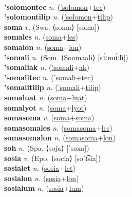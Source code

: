  \label{'solomonwon} \\
\textbf{'solomontec} \textit{n.} (\hyperref['solomon]{'solomon}+\hyperref[tec]{tec})
 \label{'solomontec} \\
\textbf{'solomontilip} \textit{n.} (\hyperref['solomon]{'solomon}+\hyperref[tilip]{tilip})
 \label{'solomontilip} \\
\textbf{soma} \textit{v.} (Swa. ⟨soma⟩ [soma])
 \label{soma} \\
\textbf{somales} \textit{n.} (\hyperref[soma]{soma}+\hyperref[les]{les})
 \label{somales} \\
\textbf{somalon} \textit{n.} (\hyperref[soma]{soma}+\hyperref[lon]{lon})
 \label{somalon} \\
\textbf{'somali} \textit{n.} (Som. ⟨Soomaali⟩ [sɔ̀ːmɑ́ːlì])
 \label{'somali} \\
\textbf{'somaliak} \textit{n.} (\hyperref['somali]{'somali}+\hyperref[ak]{ak})
 \label{'somaliak} \\
\textbf{'somalitec} \textit{n.} (\hyperref['somali]{'somali}+\hyperref[tec]{tec})
 \label{'somalitec} \\
\textbf{'somalitilip} \textit{n.} (\hyperref['somali]{'somali}+\hyperref[tilip]{tilip})
 \label{'somalitilip} \\
\textbf{somaluat} \textit{n.} (\hyperref[soma]{soma}+\hyperref[luat]{luat})
 \label{somaluat} \\
\textbf{somalyot} \textit{n.} (\hyperref[soma]{soma}+\hyperref[lyot]{lyot})
 \label{somalyot} \\
\textbf{somasoma} \textit{v.} (\hyperref[soma]{soma}+\hyperref[soma]{soma})
 \label{somasoma} \\
\textbf{somasomales} \textit{n.} (\hyperref[somasoma]{somasoma}+\hyperref[les]{les})
 \label{somasomales} \\
\textbf{somasomalon} \textit{n.} (\hyperref[somasoma]{somasoma}+\hyperref[lon]{lon})
 \label{somasomalon} \\
\textbf{soh} \textit{n.} (Spa. ⟨soja⟩ [ˈsoxa])
 \label{soh} \\
\textbf{sosia} \textit{v.} (Epo. ⟨socia⟩ [soˈt͡sia])
 \label{sosia} \\
\textbf{sosialet} \textit{n.} (\hyperref[sosia]{sosia}+\hyperref[let]{let})
 \label{sosialet} \\
\textbf{sosialon} \textit{n.} (\hyperref[sosia]{sosia}+\hyperref[lon]{lon})
 \label{sosialon} \\
\textbf{sosialum} \textit{n.} (\hyperref[sosia]{sosia}+\hyperref[lum]{lum})
 \label{sosialum} \\
